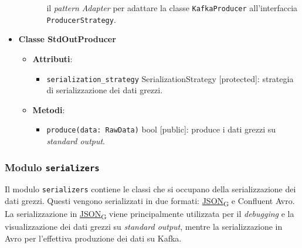 \begin{itemize}
\begin{itemize}
\begin{itemize}
			                  il \textit{pattern} \textit{Adapter} per adattare la classe \texttt{KafkaProducer} all'interfaccia \texttt{ProducerStrategy}.
		            \end{itemize}
	      \end{itemize}
	\item \textbf{Classe StdOutProducer}
	      \begin{itemize}
		      \item \textbf{Attributi}:
		            \begin{itemize}
			            \item \texttt{serialization\_strategy} SerializationStrategy [protected]: strategia di serializzazione dei dati grezzi.
		            \end{itemize}
		      \item \textbf{Metodi}:
		            \begin{itemize}
			            \item \texttt{produce(data: RawData)} bool [public]: produce i dati grezzi su \textit{standard output}.
		            \end{itemize}
	      \end{itemize}
\end{itemize}

\subsubsection{Modulo \texttt{serializers}}
Il modulo \texttt{serializers} contiene le classi che si occupano della serializzazione dei dati grezzi. Questi vengono serializzati in due formati: \href{https://7last.github.io/docs/pb/documentazione-interna/glossario\#javascript-object-notation}{JSON\textsubscript{G}} e Confluent Avro.
La serializzazione in \href{https://7last.github.io/docs/pb/documentazione-interna/glossario\#javascript-object-notation}{JSON\textsubscript{G}} viene principalmente utilizzata per il \textit{debugging} e la visualizzazione dei dati grezzi su \textit{standard output}, mentre la serializzazione in Avro
per l'effettiva produzione dei dati su Kafka.

